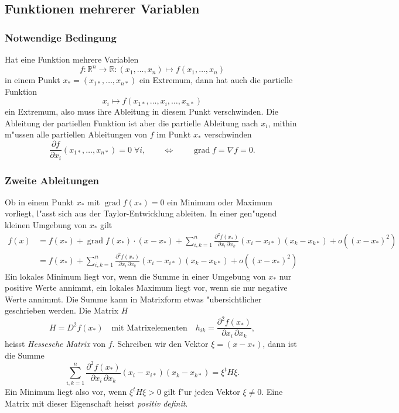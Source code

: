 \subsection{Funktionen mehrerer Variablen\label{nlp:extremwerte:mehrerevariable}}
\subsubsection{Notwendige Bedingung}
Hat eine Funktion mehrere Variablen
\[
f\colon\mathbb R^n\to\mathbb R:(x_1,\dots,x_n)\mapsto f(x_1,\dots,x_n)
\]
in einem Punkt $x_*=(x_{1*},\dots,x_{n*})$ ein Extremum,
dann hat auch die partielle Funktion
\[
x_i\mapsto f(x_{1*},\dots,x_i,\dots,x_{n*})
\]
ein Extremum, also muss ihre Ableitung in diesem Punkt
verschwinden. Die Ableitung der partiellen Funktion ist aber
die partielle Ableitung nach $x_i$, mithin m"ussen
alle partiellen Ableitungen von $f$ im Punkt $x_*$ verschwinden
\begin{equation}
\frac{\partial f}{\partial x_i}(x_{1*},\dots,x_{n*})=0\;\forall i,
\qquad \Leftrightarrow\qquad
\operatorname{grad}f=\nabla f=0.
\end{equation}

\subsubsection{Zweite Ableitungen}
Ob in einem Punkt $x_*$ mit $\operatorname{grad}f(x_*)=0$ ein
Minimum oder Maximum vorliegt, l"asst sich aus der Taylor-Entwicklung
ableiten. In einer gen"ugend kleinen Umgebung von $x_*$ gilt
\begin{align*}
f(x)&=f(x_*)+\operatorname{grad}f(x_*)\cdot (x-x_*)+
\sum_{i,k=1}^n\frac{\partial^2 f(x_*)}{\partial x_i\,\partial x_k}(x_i-x_{i*})(x_k-x_{k*})+o((x-x_*)^2)
\\
&=f(x_*)+
\sum_{i,k=1}^n\frac{\partial^2 f(x_*)}{\partial x_i\,\partial x_k}(x_i-x_{i*})(x_k-x_{k*})
+o((x-x_*)^2)
\end{align*}
Ein lokales Minimum liegt vor, wenn die Summe in einer Umgebung
von $x_*$ nur positive Werte annimmt, ein lokales Maximum liegt vor,
wenn sie nur negative Werte annimmt.
Die Summe kann in Matrixform etwas "ubersichtlicher geschrieben werden.
Die Matrix $H$
\begin{equation}
H=D^2f(x_*) \quad\text{mit Matrixelementen}\quad
h_{ik}=
\frac{\partial^2 f(x_*)}{\partial x_i\,\partial x_k},
\end{equation}
heisst {\it Hessesche Matrix} von $f$.
Schreiben wir den Vektor $\xi = (x-x_*)$, dann ist die Summe
\[
\sum_{i,k=1}^n\frac{\partial^2 f(x_*)}{\partial x_i\,\partial x_k}(x_i-x_{i*})(x_k-x_{k*})
=\xi^tH\xi.
\]
Ein Minimum liegt also vor,
wenn $\xi^t H\xi > 0$ gilt f"ur jeden Vektor $\xi\ne 0$.
Eine Matrix mit dieser Eigenschaft heisst {\it positiv definit}.

